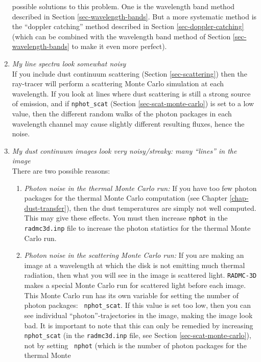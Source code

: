 \documentclass{report}
\begin{document}
\begin{enumerate}
  possible solutions to this problem. One is the wavelength band method
  described in Section \ref{sec-wavelength-bands}.  But a more systematic
  method is the ``doppler catching'' method described in Section
  \ref{sec-doppler-catching} (which can be combined with the wavelength band
  method of Section \ref{sec-wavelength-bands} to make it even more perfect).
\item {\em My line spectra look somewhat noisy}\\
  If you include dust continuum scattering (Section \ref{sec-scattering})
  then the ray-tracer will perform a scattering Monte Carlo simulation 
  at each wavelength. If you look at lines where dust scattering is still
  a strong source of emission, and if {\small\tt nphot\_scat} (Section
  \ref{sec-scat-monte-carlo}) is set to a low value, then the different
  random walks of the photon packages in each wavelength channel may
  cause slightly different resulting fluxes, hence the noise. 
\item {\em My dust continuum images look very noisy/streaky: many ``lines'' in the image}\\
  There are two possible reasons:
  \begin{enumerate}
    \item {\em Photon noise in the thermal Monte Carlo run:} If you
      have too few photon packages for the thermal Monte Carlo computation
      (see Chapter \ref{chap-dust-transfer}), then the dust temperatures
      are simply not well computed. This may give these effects. You must
      then increase {\small\tt nphot} in the {\small\tt radmc3d.inp} file
      to increase the photon statistics for the thermal Monte Carlo run.
    \item {\em Photon noise in the scattering Monte Carlo run:} If you are
      making an image at a wavelength at which the disk is not emitting much
      thermal radiation, then what you will see in the image is scattered
      light.  {\small\tt RADMC-3D} makes a special Monte Carlo run for
      scattered light before each image. This Monte Carlo run has its own
      variable for setting the number of photon packages: {\small\tt
        nphot\_scat}. If this value is set too low, then you can see
      individual ``photon''-trajectories in the image, making the image look
      bad. It is important to note that this can only be remedied by
      increasing {\small\tt nphot\_scat} (in the {\small\tt radmc3d.inp} file,
      see Section \ref{sec-scat-monte-carlo}), not by setting {\small\tt
        nphot} (which is the number of photon packages for the thermal Monte

\end{enumerate}
\end{enumerate}
\end{document}
